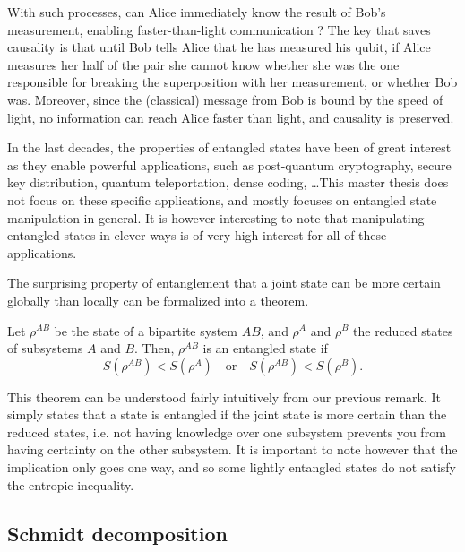 With such processes, can Alice immediately know the result of Bob's measurement, enabling faster-than-light communication ? The key that saves causality is that until Bob tells Alice that he has measured his qubit, if Alice measures her half of the pair she cannot know whether she was the one responsible for breaking the superposition with her measurement, or whether Bob was. Moreover, since the (classical) message from Bob is bound by the speed of light, no information can reach Alice faster than light, and causality is preserved.

In the last decades, the properties of entangled states have been of great interest as they enable powerful applications, such as post-quantum cryptography, secure key distribution, quantum teleportation, dense coding, \dots This master thesis does not focus on these specific applications, and mostly focuses on entangled state manipulation in general. It is however interesting to note that manipulating entangled states in clever ways is of very high interest for all of these applications.

The surprising property of entanglement that a joint state can be more certain globally than locally can be formalized into a theorem.

\begin{theorem} \label{th:entropic_criterion}
    Let $\rho^{AB}$ be the state of a bipartite system $AB$, and $\rho^A$ and $\rho^B$ the reduced states of subsystems $A$ and $B$. Then, $\rho^{AB}$ is an entangled state if 
    \begin{equation}
        S(\rho^{AB}) < S(\rho^A) \quad \text{or} \quad S(\rho^{AB}) < S(\rho^B).
    \end{equation}
\end{theorem}

This theorem can be understood fairly intuitively from our previous remark. It simply states that a state is entangled if the joint state is more certain than the reduced states, i.e. not having knowledge over one subsystem prevents you from having certainty on the other subsystem. It is important to note however that the implication only goes one way, and so some lightly entangled states do not satisfy the entropic inequality.



\subsection{Schmidt decomposition} \label{sec:schmidt}

